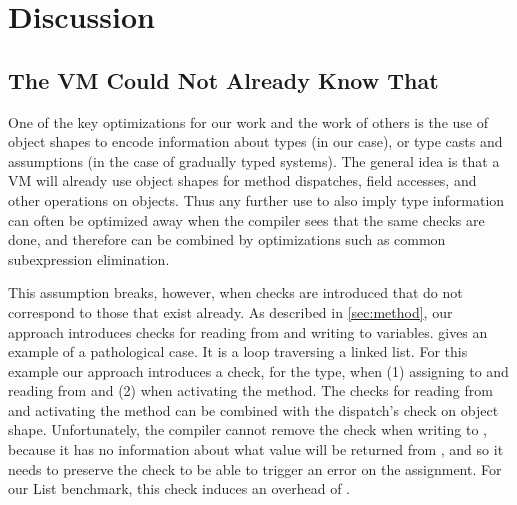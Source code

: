 
\section{Discussion}
\label{sec:discussion}

\subsection{The VM Could Not Already Know That}
\label{sec:disc-pathological-case}



One of the key optimizations for our work
and the work of others\citep{Bauman2017,Richards2017}
is the use of object shapes
to encode information about types
(in our case),
or type casts and assumptions
(in the case of gradually typed systems).
%
The general idea is that a VM will already use object shapes
for method dispatches, field accesses, and other operations on objects.
Thus any further use to also imply type information
can often be optimized away
when the compiler sees that the same checks are done,
and therefore can be combined
by optimizations such as common subexpression elimination.

This assumption breaks, however, when checks are introduced
that do not correspond to those that exist already.
As described in \cref{sec:method},
our approach introduces checks for reading from and writing to variables.
 gives an example of a pathological case.
It is a loop traversing a linked list.
For this example our approach 
introduces a check, for the  type,
when (1) assigning to and reading from  and
(2) when activating the  method.
The checks for reading from  and activating the method can be
combined with the dispatch's check on object shape.
%
Unfortunately, the compiler cannot remove the check
when writing to , because it has no information about
what value will be returned from , and so it needs to preserve the check to be able to trigger an error
on the assignment.
For our List benchmark, this check induces an overhead of \OverheadListP.

